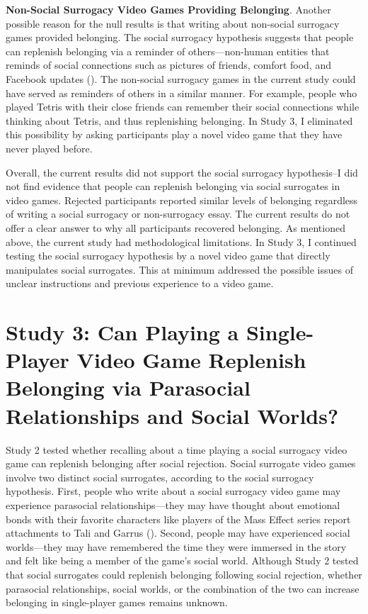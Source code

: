 \documentclass[
]{udthesis}
\begin{document}
\textbf{Non-Social Surrogacy Video Games Providing Belonging}. Another possible reason for the null results is that writing about non-social surrogacy games provided belonging. The social surrogacy hypothesis suggests that people can replenish belonging via a reminder of others---non-human entities that reminds of social connections such as pictures of friends, comfort food, and Facebook updates (). The non-social surrogacy games in the current study could have served as reminders of others in a similar manner. For example, people who played Tetris with their close friends can remember their social connections while thinking about Tetris, and thus replenishing belonging. In Study 3, I eliminated this possibility by asking participants play a novel video game that they have never played before.

Overall, the current results did not support the social surrogacy hypothesis--I did not find evidence that people can replenish belonging via social surrogates in video games. Rejected participants reported similar levels of belonging regardless of writing a social surrogacy or non-surrogacy essay. The current results do not offer a clear answer to why all participants recovered belonging. As mentioned above, the current study had methodological limitations. In Study 3, I continued testing the social surrogacy hypothesis by a novel video game that directly manipulates social surrogates. This at minimum addressed the possible issues of unclear instructions and previous experience to a video game.

\chapter{Study 3: Can Playing a Single-Player Video Game Replenish Belonging via Parasocial Relationships and Social Worlds?}\label{study-3-can-playing-a-single-player-video-game-replenish-belonging-via-parasocial-relationships-and-social-worlds}

Study 2 tested whether recalling about a time playing a social surrogacy
video game can replenish belonging after social rejection. Social
surrogate video games involve two distinct social surrogates, according
to the social surrogacy hypothesis. First, people who write about a
social surrogacy video game may experience parasocial
relationships---they may have thought about emotional bonds with their
favorite characters like players of the Mass Effect series report
attachments to Tali and Garrus (). Second, people may have
experienced social worlds---they may have remembered the time they were
immersed in the story and felt like being a member of the game's social
world. Although Study 2 tested that social surrogates could replenish
belonging following social rejection, whether parasocial relationships,
social worlds, or the combination of the two can increase belonging in
single-player games remains unknown.
\end{document}
